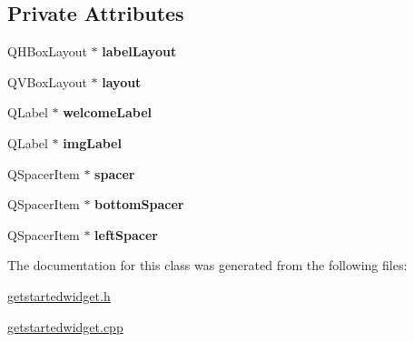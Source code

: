 \subsection*{Private Attributes}
\begin{DoxyCompactItemize}
\item 
\hypertarget{class_get_started_widget_a967f3dadf71419dad0337e76a4700085}{}Q\+H\+Box\+Layout $\ast$ {\bfseries label\+Layout}\label{class_get_started_widget_a967f3dadf71419dad0337e76a4700085}

\item 
\hypertarget{class_get_started_widget_aed1b1611fa79fea98f289be0927aeb13}{}Q\+V\+Box\+Layout $\ast$ {\bfseries layout}\label{class_get_started_widget_aed1b1611fa79fea98f289be0927aeb13}

\item 
\hypertarget{class_get_started_widget_a2c001e9a29d232afbf5185097a97b481}{}Q\+Label $\ast$ {\bfseries welcome\+Label}\label{class_get_started_widget_a2c001e9a29d232afbf5185097a97b481}

\item 
\hypertarget{class_get_started_widget_a00139a801f4614d47189081e71e6f932}{}Q\+Label $\ast$ {\bfseries img\+Label}\label{class_get_started_widget_a00139a801f4614d47189081e71e6f932}

\item 
\hypertarget{class_get_started_widget_a7fd3a6ac1bac6e326b8dab87ee313b52}{}Q\+Spacer\+Item $\ast$ {\bfseries spacer}\label{class_get_started_widget_a7fd3a6ac1bac6e326b8dab87ee313b52}

\item 
\hypertarget{class_get_started_widget_aa697f30ca3a5facd85e4a70e98001c65}{}Q\+Spacer\+Item $\ast$ {\bfseries bottom\+Spacer}\label{class_get_started_widget_aa697f30ca3a5facd85e4a70e98001c65}

\item 
\hypertarget{class_get_started_widget_ac5e0e935d94b17e251cea738c920bd66}{}Q\+Spacer\+Item $\ast$ {\bfseries left\+Spacer}\label{class_get_started_widget_ac5e0e935d94b17e251cea738c920bd66}

\end{DoxyCompactItemize}


The documentation for this class was generated from the following files\+:\begin{DoxyCompactItemize}
\item 
\hyperlink{getstartedwidget_8h}{getstartedwidget.\+h}\item 
\hyperlink{getstartedwidget_8cpp}{getstartedwidget.\+cpp}\end{DoxyCompactItemize}
